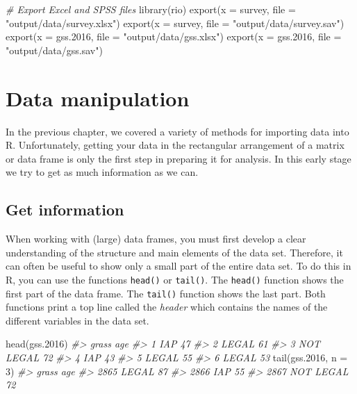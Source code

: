 \documentclass[
]{book}
\newenvironment{Shaded}{\begin{snugshade}}{\end{snugshade}}
\newcommand{\AttributeTok}[1]{\textcolor[rgb]{0.77,0.63,0.00}{#1}}
\newcommand{\CommentTok}[1]{\textcolor[rgb]{0.56,0.35,0.01}{\textit{#1}}}
\newcommand{\DecValTok}[1]{\textcolor[rgb]{0.00,0.00,0.81}{#1}}
\newcommand{\FloatTok}[1]{\textcolor[rgb]{0.00,0.00,0.81}{#1}}
\newcommand{\FunctionTok}[1]{\textcolor[rgb]{0.00,0.00,0.00}{#1}}
\newcommand{\NormalTok}[1]{#1}
\newcommand{\StringTok}[1]{\textcolor[rgb]{0.31,0.60,0.02}{#1}}
\begin{document}
\begin{Shaded}
\begin{Highlighting}[]
\CommentTok{\# Export Excel and SPSS files}
\FunctionTok{library}\NormalTok{(rio)}
\FunctionTok{export}\NormalTok{(}\AttributeTok{x =}\NormalTok{ survey, }\AttributeTok{file =} \StringTok{"output/data/survey.xlsx"}\NormalTok{)}
\FunctionTok{export}\NormalTok{(}\AttributeTok{x =}\NormalTok{ survey, }\AttributeTok{file =} \StringTok{"output/data/survey.sav"}\NormalTok{)}
\FunctionTok{export}\NormalTok{(}\AttributeTok{x =}\NormalTok{ gss}\FloatTok{.2016}\NormalTok{, }\AttributeTok{file =} \StringTok{"output/data/gss.xlsx"}\NormalTok{)}
\FunctionTok{export}\NormalTok{(}\AttributeTok{x =}\NormalTok{ gss}\FloatTok{.2016}\NormalTok{, }\AttributeTok{file =} \StringTok{"output/data/gss.sav"}\NormalTok{)}
\end{Highlighting}
\end{Shaded}

\hypertarget{data-manipulation}{%
\section{Data manipulation}\label{data-manipulation}}

In the previous chapter, we covered a variety of methods for importing data into R. Unfortunately, getting your data in the rectangular arrangement of a matrix or data frame is only the first step in preparing it for analysis. In this early stage we try to get as much information as we can.

\hypertarget{get-information}{%
\subsection{Get information}\label{get-information}}

When working with (large) data frames, you must first develop a clear understanding of the structure and main elements of the data set. Therefore, it can often be useful to show only a small part of the entire data set. To do this in R, you can use the functions \texttt{head()} or \texttt{tail()}. The \texttt{head()} function shows the first part of the data frame. The \texttt{tail()} function shows the last part. Both functions print a top line called the \emph{header} which contains the names of the different variables in the data set.

\begin{Shaded}
\begin{Highlighting}[]
\FunctionTok{head}\NormalTok{(gss}\FloatTok{.2016}\NormalTok{)}
\CommentTok{\#\textgreater{}       grass age}
\CommentTok{\#\textgreater{} 1       IAP  47}
\CommentTok{\#\textgreater{} 2     LEGAL  61}
\CommentTok{\#\textgreater{} 3 NOT LEGAL  72}
\CommentTok{\#\textgreater{} 4       IAP  43}
\CommentTok{\#\textgreater{} 5     LEGAL  55}
\CommentTok{\#\textgreater{} 6     LEGAL  53}
\FunctionTok{tail}\NormalTok{(gss}\FloatTok{.2016}\NormalTok{, }\AttributeTok{n =} \DecValTok{3}\NormalTok{)}
\CommentTok{\#\textgreater{}          grass age}
\CommentTok{\#\textgreater{} 2865     LEGAL  87}
\CommentTok{\#\textgreater{} 2866       IAP  55}
\CommentTok{\#\textgreater{} 2867 NOT LEGAL  72}
\end{Highlighting}
\end{Shaded}
\end{document}
